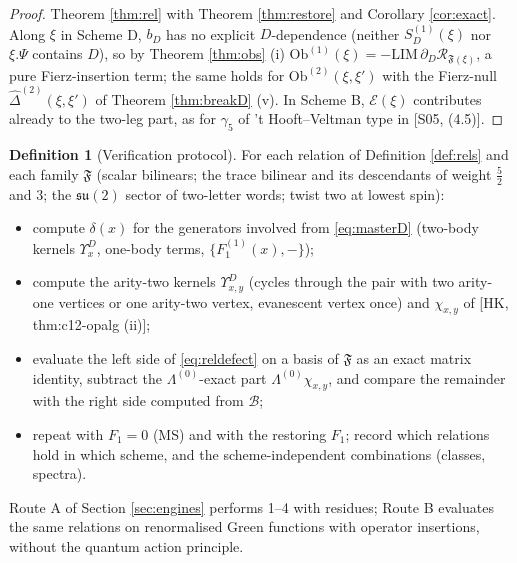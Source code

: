 \documentclass[11pt]{article}
\theoremstyle{definition}
\newtheorem{definition}{Definition}[section]
\numberwithin{equation}{section}
\begin{document}
\begin{proof}
Theorem \ref{thm:rel} with Theorem \ref{thm:restore} and Corollary \ref{cor:exact}. Along $\xi$ in Scheme D, $b_D$ has no explicit $D$-dependence (neither $S^{(1)}_D(\xi)$ nor $\xi.\Psi$ contains $D$), so by Theorem \ref{thm:obs} (i) $\mathrm{Ob}^{(1)}(\xi)=-\mathrm{LIM}\,\partial_D\mathcal R_{\mathfrak F(\xi)}$, a pure Fierz-insertion term; the same holds for $\mathrm{Ob}^{(2)}(\xi,\xi')$ with the Fierz-null $\widehat\Delta^{(2)}(\xi,\xi')$ of Theorem \ref{thm:breakD} (v). In Scheme B, $\mathcal E(\xi)$ contributes already to the two-leg part, as for $\gamma_5$ of 't Hooft--Veltman type in [S05, (4.5)].
\end{proof}

\begin{definition}[Verification protocol]
\label{def:protocol}
For each relation of Definition \ref{def:rels} and each family $\mathfrak F$ (scalar bilinears; the trace bilinear and its descendants of weight $\frac52$ and $3$; the $\mathfrak{su}(2)$ sector of two-letter words; twist two at lowest spin):
\begin{itemize}
\item[1.] compute $\delta(x)$ for the generators involved from \eqref{eq:masterD} (two-body kernels $\Upsilon^D_x$, one-body terms, $\{F^{(1)}_1(x),-\}$);
\item[2.] compute the arity-two kernels $\Upsilon^D_{x,y}$ (cycles through the pair with two arity-one vertices or one arity-two vertex, evanescent vertex once) and $\chi_{x,y}$ of [HK, thm:c12-opalg (ii)];
\item[3.] evaluate the left side of \eqref{eq:reldefect} on a basis of $\mathfrak F$ as an exact matrix identity, subtract the $\Lambda^{(0)}$-exact part $\Lambda^{(0)}\chi_{x,y}$, and compare the remainder with the right side computed from $\mathcal B$;
\item[4.] repeat with $F_1=0$ (MS) and with the restoring $F_1$; record which relations hold in which scheme, and the scheme-independent combinations (classes, spectra).
\end{itemize}
Route A of Section \ref{sec:engines} performs 1--4 with residues; Route B evaluates the same relations on renormalised Green functions with operator insertions, without the quantum action principle.
\end{definition}
\end{document}
